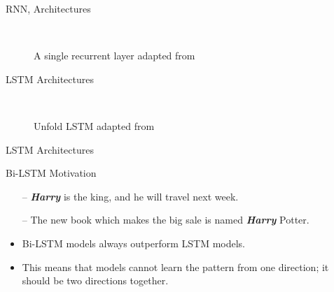 \begin{frame}[fragile]{RNN, Architectures}
\begin{figure}[t]

\endminipage\hfill
{}

\endminipage\hfill
{}%

\endminipage
\caption{A single recurrent layer adapted from~\cite{colah}}~\label{Fig:LSTM_SimpleRNN}
\end{figure}%
\end{frame}


\begin{frame}[fragile]{LSTM Architectures}
\begin{figure}[t]

\endminipage\hfill
{}

\endminipage\hfill
{}%

\endminipage
\caption{Unfold LSTM adapted from~\cite{colah}}
~\label{Fig:LSTM_Cell_Chaining}
\end{figure}%
\end{frame}


\begin{frame}[fragile]{LSTM Architectures}
\begin{block}{Bi-LSTM Motivation}
\begin{itemize}
\item[--] \textit{\textbf{Harry}} is the king, and he will travel next week.
\item[--] The new book which makes the big sale is named \textit{\textbf{Harry}} Potter.
\end{itemize}
\end{block}

\begin{itemize}
\item Bi-LSTM models always outperform LSTM models.
\item This means that models cannot learn the pattern from one direction; it
should be two directions together.
\end{itemize}
\end{frame}

